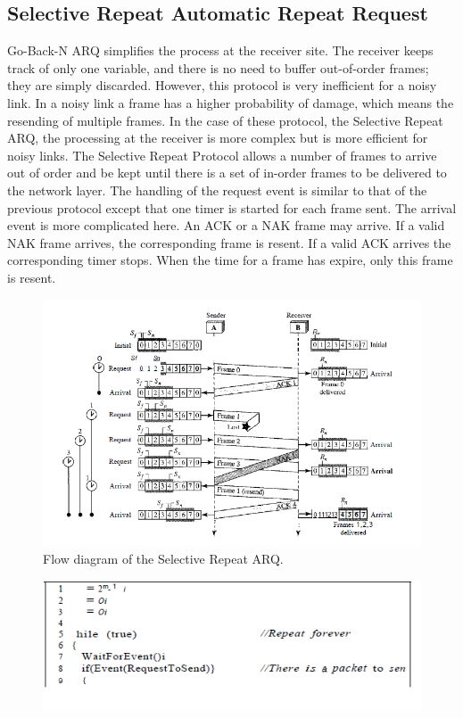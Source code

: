 \documentclass[12pt,a4paper]{report}
\begin{document}
\subsection{Selective Repeat Automatic Repeat Request}
Go-Back-N ARQ simplifies the process at the receiver site. The receiver keeps track of
only one variable, and there is no need to buffer out-of-order frames; they are simply
discarded. However, this protocol is very inefficient for a noisy link. In a noisy link a
frame has a higher probability of damage, which means the resending of multiple frames. In the case of these protocol, the Selective Repeat ARQ, the processing at the receiver is more complex but is more efficient for noisy links. The Selective Repeat Protocol allows a number of frames to arrive out of order and be kept until there is a set of in-order frames to be
delivered to the network layer. The handling of the request event is similar to that of the previous protocol except
that one timer is started for each frame sent. The arrival event is more complicated here. An ACK
or a NAK frame may arrive. If a valid NAK frame arrives, the corresponding frame is resent. If a valid ACK arrives the corresponding timer stops. When the time for a frame has expire, only this frame is resent.
\begin{figure}[H]
\begin{center}
\includegraphics[scale=0.8]{flowselective.PNG}  
\caption{Flow diagram of the Selective Repeat ARQ.}
\end{center}
\end{figure}
\begin{figure}[H]
\begin{center}
\includegraphics[scale=0.8]{senderselective1.PNG}
\end{center} 
\end{figure}
\end{document}
